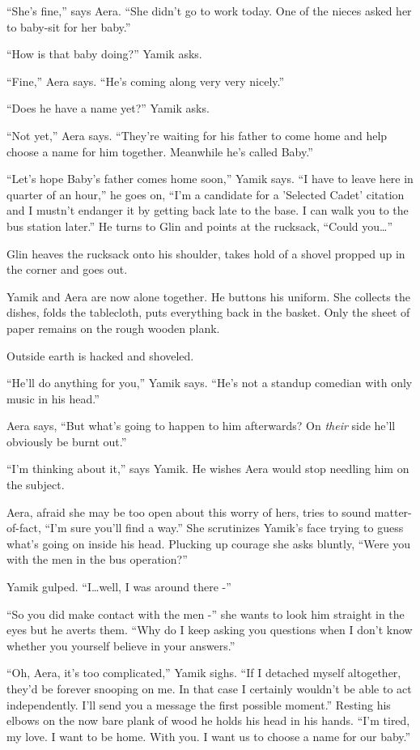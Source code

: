 \documentclass[twoside,11pt]{book}
\begin{document}
``She's fine,'' says Aera. ``She didn't go to work today.  One of the nieces
asked her to baby-sit for her baby.''

``How is that baby doing?'' Yamik asks.

``Fine,'' Aera says. ``He's coming along very very nicely.''

``Does he have a name yet?'' Yamik asks.

``Not yet,'' Aera says. ``They're waiting for his father to come home and help
choose a name for him together. Meanwhile he's called Baby.''

``Let's hope Baby's father comes home soon,'' Yamik says. ``I have to leave here
in quarter of an hour,'' he goes on, ``I'm a candidate for a 'Selected Cadet' citation and I mustn't endanger it by
getting back late to the base. I can walk you to the bus station later.'' He turns to Glin and points at
the rucksack, ``Could you{\dots}''

Glin heaves the rucksack onto his shoulder, takes hold of a shovel propped up
in the corner and goes out.

Yamik and Aera are now alone together. He buttons his uniform. She collects the dishes, folds the tablecloth, puts
everything back in the basket. Only the sheet of paper remains on the rough wooden plank.

Outside earth is hacked and shoveled.

``He'll do anything for you,'' Yamik says. ``He's not a standup comedian
with only music in his head.''

Aera says, ``But what's going to happen to him afterwards? On \textit{their} side he'll obviously be burnt
out.''

``I'm thinking about it,'' says Yamik. He wishes
Aera would stop needling him on the subject.

Aera, afraid she may be too open about this worry of hers, tries to sound matter-of-fact, ``I'm sure you'll
find a way.'' She scrutinizes Yamik's face trying to guess what's going on inside his head. Plucking up
courage she asks bluntly, ``Were you with the men in the bus operation?''

Yamik gulped. ``I{\dots}well, I was around there -''

``So you did make contact with the men -'' she wants to look
him straight in the eyes but he averts them. ``Why do I keep
asking you questions when I don't know whether you yourself believe in your answers.''

``Oh, Aera, it's too complicated,'' Yamik sighs. ``If I detached myself
altogether, they'd be forever snooping on me. In that case I certainly wouldn't be able to act
independently. I'll send you a message the first possible moment.'' Resting his elbows on the now bare
plank of wood he holds his head in his hands. ``I'm tired, my love. I want to be home. With you. I want
us to choose a name for our baby.''
\end{document}
